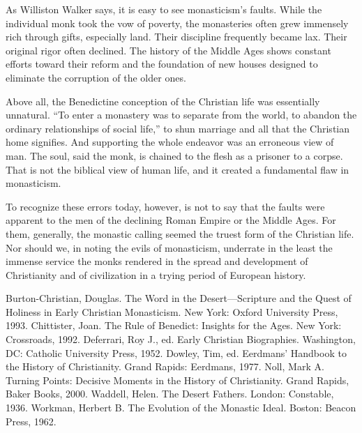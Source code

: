 As Williston Walker says, it is easy to see monasticism’s faults. While the individual monk took the
vow of poverty, the monasteries often grew immensely rich through gifts, especially land. Their
discipline frequently became lax. Their original rigor often declined. The history of the Middle
Ages shows constant efforts toward their reform and the foundation of new houses designed to
eliminate the corruption of the older ones.

Above all, the Benedictine conception of the Christian life was essentially unnatural. “To enter a
monastery was to separate from the world, to abandon the ordinary relationships of social life,” to
shun marriage and all that the Christian home signifies. And supporting the whole endeavor was an
erroneous view of man. The soul, said the monk, is chained to the flesh as a prisoner to a corpse.
That is not the biblical view of human life, and it created a fundamental flaw in monasticism.

To recognize these errors today, however, is not to say that the faults were apparent to the men of
the declining Roman Empire or the Middle Ages. For them, generally, the monastic calling seemed the
truest form of the Christian life. Nor should we, in noting the evils of monasticism, underrate in
the least the immense service the monks rendered in the spread and development of Christianity and
of civilization in a trying period of European history.

\begin{readinglist}
\entry *Burton-Christian, Douglas. The Word in the Desert—Scripture and the Quest of Holiness in
  Early Christian Monasticism. New York: Oxford University Press, 1993.
\entry Chittister, Joan. The Rule of Benedict: Insights for the Ages. New York: Crossroads, 1992.
\entry Deferrari, Roy J., ed. Early Christian Biographies. Washington, DC: Catholic University
  Press, 1952.
\entry Dowley, Tim, ed. Eerdmans’ Handbook to the History of Christianity. Grand Rapids: Eerdmans,
  1977.
\entry Noll, Mark A. Turning Points: Decisive Moments in the History of Christianity. Grand Rapids,
  Baker Books, 2000.
\entry Waddell, Helen. The Desert Fathers. London: Constable, 1936.
\entry Workman, Herbert B. The Evolution of the Monastic Ideal. Boston: Beacon Press, 1962.
\end{readinglist}
